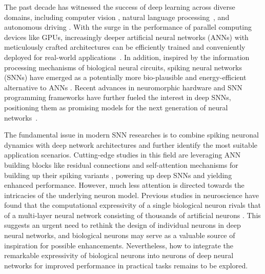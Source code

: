 The past decade has witnessed the success of deep learning across diverse domains, including computer vision \cite{krizhevsky2017alexnet,he2016resnet}, natural language processing~\cite{vaswani2017transformer,devlin2019bert,openai2023gpt4}, and autonomous driving \cite{lechner2020ncp,vorbach2021causal}. With the surge in the performance of parallel computing devices like GPUs, increasingly deeper artificial neural networks (ANNs) with meticulously crafted architectures can be efficiently trained and conveniently deployed for real-world applications~\cite{coates2013hpc,chetlur2014cudnn,jia2019dissecting}. In addition, inspired by the information processing mechanisms of biological neural circuits, spiking neural networks (SNNs) have emerged as a potentially more bio-plausible and energy-efficient alternative to ANNs \cite{hassabis2017neuroscience,roy2019towards}. Recent advances in neuromorphic hardware \cite{davies2018loihi,debole2019truenorth,pei2019tianjic} and SNN programming frameworks \cite{hazan2018bindsnet,eshraghian2023snntorch,fang2023spikingjelly} have further fueled the interest in deep SNNs, positioning them as promising models for the next generation of neural networks~\cite{maass1997networks}. 

The fundamental issue in modern SNN researches is to combine spiking neuronal dynamics with deep network architectures and further identify the most suitable application scenarios. Cutting-edge studies in this field are leveraging ANN building blocks like residual connections \cite{he2016resnet} and self-attention mechanisms \cite{vaswani2017transformer} for building up their spiking variants \cite{zheng2020going,fang2021sew,hu2023advancing,zhou2023spikformer,zhou2023spikingformer,yao2023spikedriventransformer,yao2024spikedriventransformer}, powering up deep SNNs and yielding enhanced performance. However, much less attention is directed towards the intricacies of the underlying neuron model. Previous studies in neuroscience have found that the computational expressivity of a single biological neuron rivals that of a multi-layer neural network consisting of thousands of artificial neurons \cite{poirazi2003pyramidal,jadi2014twolayer,tzilivaki2018dogma,beniaguev2021cortical}. This suggests an urgent need to rethink the design of individual neurons in deep neural networks, and biological neurons may serve as a valuable source of inspiration for possible enhancements. Nevertheless, how to integrate the remarkable expressivity of biological neurons into neurons of deep neural networks for improved performance in practical tasks remains to be explored. %

